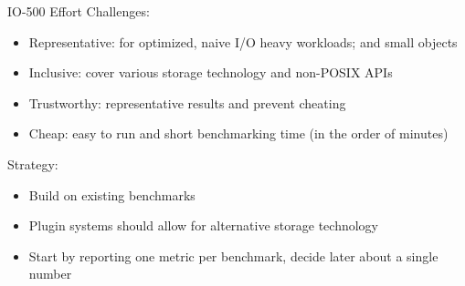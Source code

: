 \documentclass[portrait,a0paper,fontscale=0.4]{baposter}
\begin{document}
\begin{poster}
\begin{posterbox}[name=HHCC,column=1,span=2, below=schedule, above=bottom]{IO-500 Effort}
Challenges:
\begin{itemize}
\item Representative: for optimized, naive I/O heavy workloads; and small objects
\item Inclusive: cover various storage technology and non-POSIX APIs
\item Trustworthy: representative results and prevent cheating
\item Cheap: easy to run and short benchmarking time (in the order of minutes)
\end{itemize}


Strategy:
\begin{itemize}
\item Build on existing benchmarks
\item Plugin systems should allow for alternative storage technology
\item Start by reporting one metric per benchmark, decide later about a single number
\end{itemize}


\end{posterbox}







\end{poster}
\end{document}
